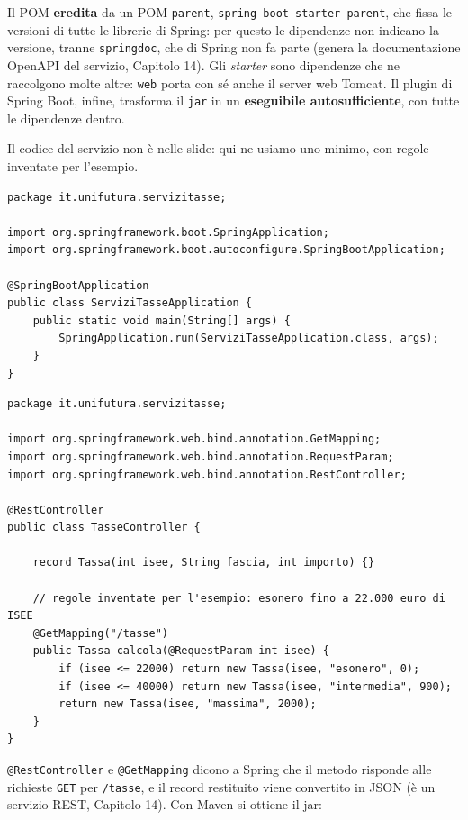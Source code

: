 Il POM \textbf{eredita} da un POM \texttt{parent}, \texttt{spring-boot-starter-parent}, che fissa le versioni di tutte
le librerie di Spring: per questo le dipendenze non indicano la versione, tranne \texttt{springdoc}, che di Spring non
fa parte (genera la documentazione OpenAPI del servizio, Capitolo 14). Gli \textit{starter} sono dipendenze che ne
raccolgono molte altre: \texttt{web} porta con sé anche il server web Tomcat. Il plugin di Spring Boot, infine,
trasforma il \texttt{jar} in un \textbf{eseguibile autosufficiente}, con tutte le dipendenze dentro.

Il codice del servizio non è nelle slide: qui ne usiamo uno minimo, con regole inventate per l'esempio.

\begin{lstlisting}[style=java, name=ServiziTasseApplication.java]
package it.unifutura.servizitasse;

import org.springframework.boot.SpringApplication;
import org.springframework.boot.autoconfigure.SpringBootApplication;

@SpringBootApplication
public class ServiziTasseApplication {
    public static void main(String[] args) {
        SpringApplication.run(ServiziTasseApplication.class, args);
    }
}
\end{lstlisting}

\begin{lstlisting}[style=java, name=TasseController.java]
package it.unifutura.servizitasse;

import org.springframework.web.bind.annotation.GetMapping;
import org.springframework.web.bind.annotation.RequestParam;
import org.springframework.web.bind.annotation.RestController;

@RestController
public class TasseController {

    record Tassa(int isee, String fascia, int importo) {}

    // regole inventate per l'esempio: esonero fino a 22.000 euro di ISEE
    @GetMapping("/tasse")
    public Tassa calcola(@RequestParam int isee) {
        if (isee <= 22000) return new Tassa(isee, "esonero", 0);
        if (isee <= 40000) return new Tassa(isee, "intermedia", 900);
        return new Tassa(isee, "massima", 2000);
    }
}
\end{lstlisting}

\texttt{@RestController} e \texttt{@GetMapping} dicono a Spring che il metodo risponde alle richieste \texttt{GET} per
\texttt{/tasse}, e il record restituito viene convertito in JSON (è un servizio REST, Capitolo 14). Con Maven si ottiene
il jar:

